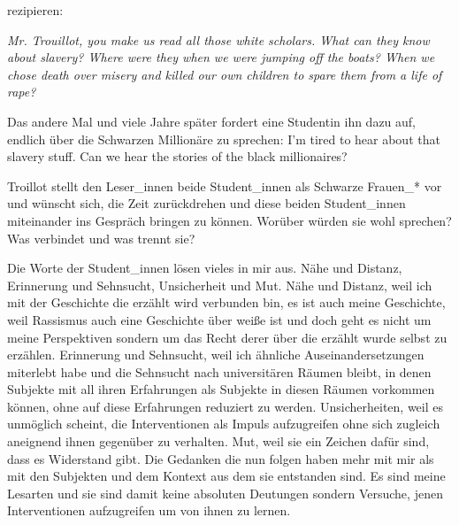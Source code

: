 \documentclass[11pt]{article}
\newenvironment{myenv}{\begin{adjustwidth}{2cm}{}}{\end{adjustwidth}}
\begin{document}
rezipieren:

\begin{myenv}
  \textit{ \glqq Mr. Trouillot, you make us read all those white scholars. What can
    they know about slavery? Where were they when we were jumping off the boats?
    When we chose death over misery and killed our own children to spare them from a
  life of rape? \grqq} \footnotemark {}  
\end{myenv}

Das andere Mal und viele Jahre später fordert eine Studentin ihn dazu auf, 
endlich über die Schwarzen Millionäre zu sprechen: 
\glqq I'm tired to hear about that slavery stuff. Can we hear the stories of the
black millionaires? \grqq \footnotemark {}   

Troillot stellt den Leser\_innen beide Student\_innen als Schwarze Frauen\_* vor
und wünscht sich, die Zeit zurückdrehen und diese beiden Student\_innen
miteinander ins Gespräch bringen zu können. Worüber würden sie wohl sprechen?
Was verbindet und was trennt sie?

Die Worte der Student\_innen lösen vieles in mir aus. Nähe und Distanz,
Erinnerung und Sehnsucht, Unsicherheit und Mut. Nähe und Distanz, weil ich mit
der Geschichte die erzählt wird verbunden bin, es ist auch meine Geschichte,
weil Rassismus auch eine Geschichte über weiße ist und doch geht es nicht um
meine Perspektiven sondern um das Recht derer über die erzählt wurde selbst zu
erzählen. Erinnerung und Sehnsucht, weil ich ähnliche Auseinandersetzungen
miterlebt habe und die Sehnsucht nach universitären Räumen bleibt, in denen
Subjekte mit all ihren Erfahrungen als Subjekte in diesen Räumen vorkommen
können, ohne auf diese Erfahrungen reduziert zu werden. Unsicherheiten, weil es
unmöglich scheint, die Interventionen als Impuls aufzugreifen ohne sich zugleich
aneignend ihnen gegenüber zu verhalten. Mut, weil sie ein Zeichen dafür sind,
dass es Widerstand gibt.  Die Gedanken die nun folgen haben mehr mit mir als mit
den Subjekten und dem Kontext aus dem sie entstanden sind. Es sind meine
Lesarten und sie sind damit keine absoluten Deutungen sondern Versuche, jenen
Interventionen aufzugreifen um von ihnen zu lernen. 
\end{document}
